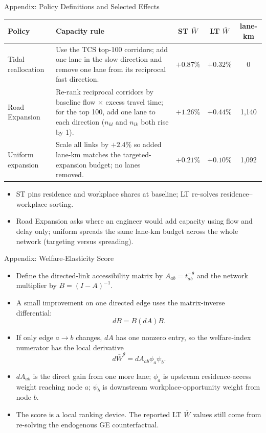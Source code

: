 \documentclass[11pt,aspectratio=169]{beamer}
\newcommand{\navback}[1]{\par\vspace{0.35em}\noindent\hfill\hyperlink{#1}{\beamerreturnbutton{back}}}
\begin{document}
\begin{frame}[label=apppolicy]{Appendix: Policy Definitions and Selected Effects}
\scriptsize
\begin{center}
\begin{tabular}{p{}p{}ccc}
\toprule
Policy & Capacity rule & ST $\bar W$ & LT $\bar W$ & lane-km \\
\midrule
Tidal reallocation & Use the TCS top-100 corridors; add one lane in the slow direction and remove one lane from its reciprocal fast direction. & $+0.87\%$ & $+0.32\%$ & 0 \\
Road Expansion & Re-rank reciprocal corridors by baseline flow $\times$ excess travel time; for the top 100, add one lane to each direction ($n_{kl}$ and $n_{lk}$ both rise by 1). & $+1.26\%$ & $+0.44\%$ & 1{,}140 \\
Uniform expansion & Scale all links by $+2.4\%$ so added lane-km matches the targeted-expansion budget; no lanes removed. & $+0.21\%$ & $+0.10\%$ & 1{,}092 \\
\bottomrule
\end{tabular}
\end{center}
\vspace{0.2em}
\begin{itemize}\footnotesize
  \item ST pins residence and workplace shares at baseline; LT re-solves residence--workplace sorting.
  \item Road Expansion asks where an engineer would add capacity using flow and delay only; uniform spreads the same lane-km budget across the whole network (targeting versus spreading).
\end{itemize}
\navback{result4}
\end{frame}

\begin{frame}[label=appelast]{Appendix: Welfare-Elasticity Score}
\scriptsize
\begin{itemize}
  \item Define the directed-link accessibility matrix by $A_{ab}=t_{ab}^{-\theta}$ and the network multiplier by $B=(I-A)^{-1}$.
  \item A small improvement on one directed edge uses the matrix-inverse differential:
  \[
    dB=B(dA)B.
  \]
  \item If only edge $a\to b$ changes, $dA$ has one nonzero entry, so the welfare-index numerator has the local derivative
  \[
    d\bar W^\theta=dA_{ab}\phi_a\psi_b.
  \]
  \item $dA_{ab}$ is the direct gain from one more lane; $\phi_a$ is upstream residence-access weight reaching node $a$; $\psi_b$ is downstream workplace-opportunity weight from node $b$.
  \item The score is a local ranking device. The reported LT $\bar W$ values still come from re-solving the endogenous GE counterfactual.
\end{itemize}
\navback{resultelast}
\end{frame}
\end{document}

